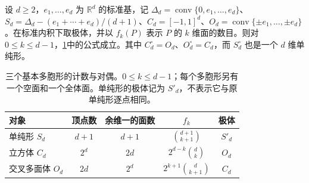 \begin{proposition}
	\label{g1:prop:basic-polytope-counts}
	设 \(d\ge2\)，\(e_1,\ldots,e_d\) 为 \(\mathbb R^d\) 的标准基，记 \(\Delta_d=\operatorname{conv}\{0,e_1,\ldots,e_d\}\)、\(S_d=\Delta_d-(e_1+\cdots+e_d)/(d+1)\)、\(C_d=[-1,1]^d\)、\(O_d=\operatorname{conv}\{\pm e_1,\ldots,\pm e_d\}\)。在标准内积下取极体，并以 \(f_k(P)\) 表示 \(P\) 的 \(k\) 维面的数目。则对 \(0\le k\le d-1\)，\cref{g1:tab:basic-polytopes}中的公式成立。其中 \(C_d^\circ=O_d\)、\(O_d^\circ=C_d\)，而 \(S_d^\circ\) 也是一个 \(d\) 维单纯形。


\begin{table}[htbp]
	\centering
	\caption[三个基本多胞形的计数与对偶]{三个基本多胞形的计数与对偶。\(0\le k\le d-1\)；每个多胞形另有一个空面和一个全体面。单纯形的极体记为 \(S'_d\)，不表示它与原单纯形逐点相同。}
	\label{g1:tab:basic-polytopes}
	\begin{tabular}{@{}lcccc@{}}
		\toprule
		对象 & 顶点数 & 余维一的面数 & \(f_k\) & 极体 \\
		\midrule
		单纯形 \(S_d\) & \(d+1\) & \(d+1\) & \(\binom{d+1}{k+1}\) & \(S'_d\) \\
		立方体 \(C_d\) & \(2^d\) & \(2d\) & \(2^{d-k}\binom dk\) & \(O_d\) \\
		交叉多面体 \(O_d\) & \(2d\) & \(2^d\) & \(2^{k+1}\binom d{k+1}\) & \(C_d\) \\
		\bottomrule
	\end{tabular}
\end{table}
\end{proposition}

